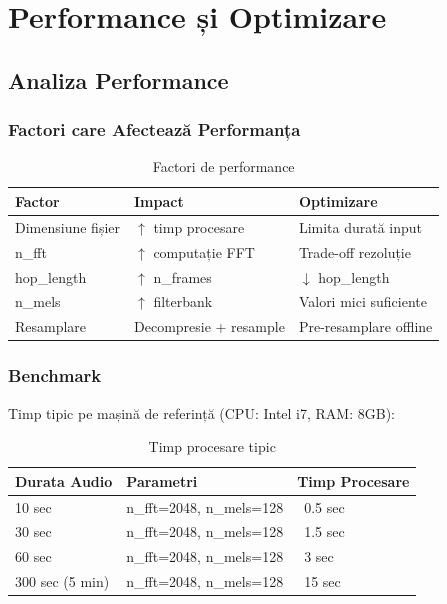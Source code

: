 \documentclass[12pt,a4paper,oneside]{book}
\begin{document}
\newpage

\chapter{Performance și Optimizare}

\section{Analiza Performance}

\subsection{Factori care Afectează Performanța}

\begin{table}[H]
\centering
\begin{tabularx}{\textwidth}{|l|X|X|}
\hline
\textbf{Factor} & \textbf{Impact} & \textbf{Optimizare} \\
\hline
Dimensiune fișier & $\uparrow$ timp procesare & Limita durată input \\
\hline
n\_fft & $\uparrow$ computație FFT & Trade-off rezoluție \\
\hline
hop\_length & $\uparrow$ n\_frames & $\downarrow$ hop\_length \\
\hline
n\_mels & $\uparrow$ filterbank & Valori mici suficiente \\
\hline
Resamplare & Decompresie + resample & Pre-resamplare offline \\
\hline
\end{tabularx}
\caption{Factori de performance}
\end{table}

\subsection{Benchmark}

Timp tipic pe mașină de referință (CPU: Intel i7, RAM: 8GB):

\begin{table}[H]
\centering
\begin{tabularx}{\textwidth}{|l|l|l|}
\hline
\textbf{Durata Audio} & \textbf{Parametri} & \textbf{Timp Procesare} \\
\hline
10 sec & n\_fft=2048, n\_mels=128 & ~0.5 sec \\
\hline
30 sec & n\_fft=2048, n\_mels=128 & ~1.5 sec \\
\hline
60 sec & n\_fft=2048, n\_mels=128 & ~3 sec \\
\hline
300 sec (5 min) & n\_fft=2048, n\_mels=128 & ~15 sec \\
\hline
\end{tabularx}
\caption{Timp procesare tipic}
\end{table}
\end{document}
